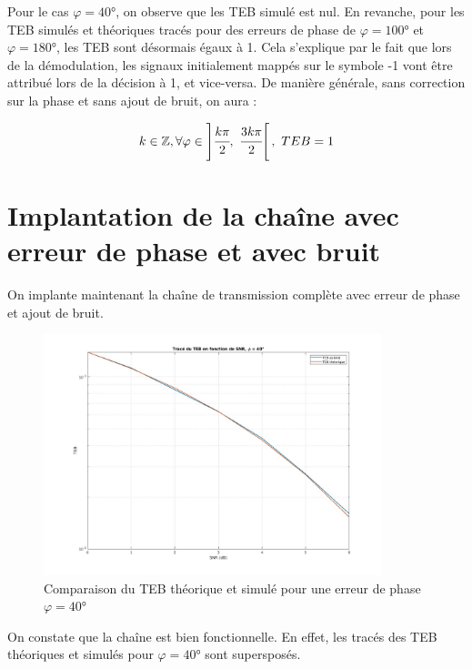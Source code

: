 \documentclass[11pt,a4paper]{report}
\begin{document}
Pour le cas $\varphi = 40$°, on observe que les TEB simulé est nul.
\newline
En revanche, pour les TEB simulés et théoriques tracés pour des erreurs de phase de $\varphi = 100$° et $\varphi = 180$°, les TEB sont désormais égaux à 1. Cela s'explique par le fait que lors de la démodulation, les signaux initialement mappés sur le symbole -1 vont être attribué lors de la décision à 1, et vice-versa. De manière générale, sans correction sur la phase et sans ajout de bruit, on aura :

\begin{align*}
    k \in \mathbb{Z}, \forall \varphi \in \displaystyle\left] \cfrac{k\pi}{2} , ~ \cfrac{3k\pi}{2} \right[, ~ TEB = 1
\end{align*}



\newpage

\section{Implantation de la chaîne avec erreur de phase et avec bruit}

On implante maintenant la chaîne de transmission complète avec erreur de phase et ajout de bruit.


\begin{figure}[H]
    \centering
    \includegraphics[height=7cm]{Screenshots/2_4_a.jpg}
    \caption{Comparaison du TEB théorique et simulé pour une erreur de phase $\varphi = 40$°}
    \label{fig:un_label} 
\end{figure}

On constate que la chaîne est bien fonctionnelle. En effet, les tracés des TEB théoriques et simulés pour $\varphi = 40$° sont supersposés.
\end{document}
